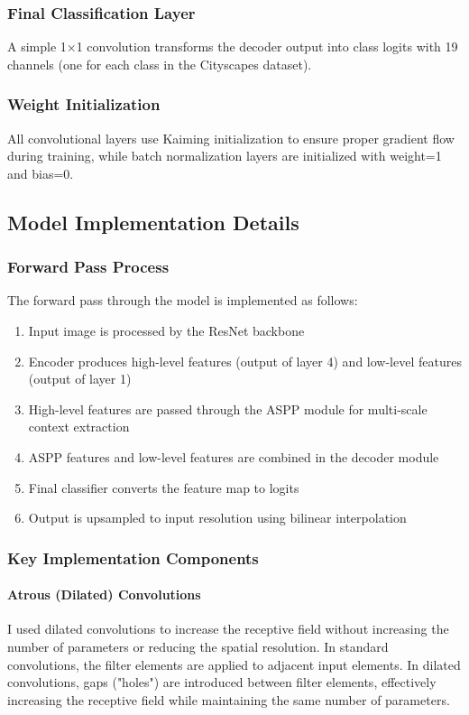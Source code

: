 \documentclass[]{article}
\begin{document}
\subsubsection{Final Classification Layer}
A simple 1×1 convolution transforms the decoder output into class logits with 19 channels (one for each class in the Cityscapes dataset).

\subsubsection{Weight Initialization}
All convolutional layers use Kaiming initialization to ensure proper gradient flow during training, while batch normalization layers are initialized with weight=1 and bias=0.

\subsection{Model Implementation Details}

\subsubsection{Forward Pass Process}
The forward pass through the model is implemented as follows:
\begin{enumerate}
    \item Input image is processed by the ResNet backbone
    \item Encoder produces high-level features (output of layer 4) and low-level features (output of layer 1)
    \item High-level features are passed through the ASPP module for multi-scale context extraction
    \item ASPP features and low-level features are combined in the decoder module
    \item Final classifier converts the feature map to logits
    \item Output is upsampled to input resolution using bilinear interpolation
\end{enumerate}

\subsubsection{Key Implementation Components}

\paragraph{Atrous (Dilated) Convolutions}
I used dilated convolutions to increase the receptive field without increasing the number of parameters or reducing the spatial resolution. In standard convolutions, the filter elements are applied to adjacent input elements. In dilated convolutions, gaps ("holes") are introduced between filter elements, effectively increasing the receptive field while maintaining the same number of parameters.
\end{document}

